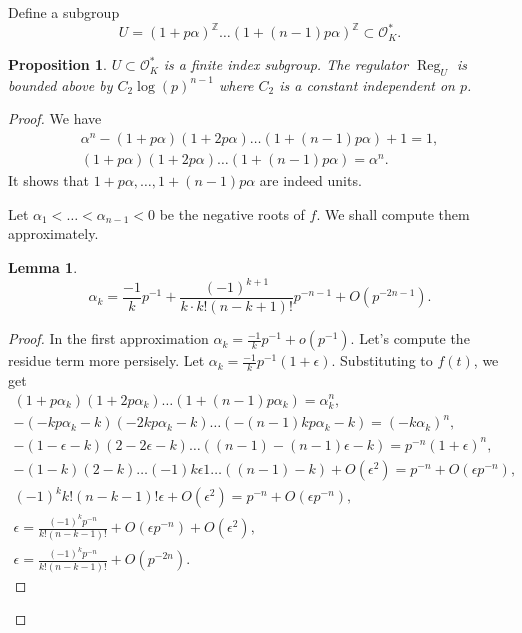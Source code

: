 \documentclass[a4paper]{article}
\newtheorem{Lem}[Thm]{Lemma}
\newtheorem{Prop}[Thm]{Proposition}
\renewcommand{\O}{\mathcal{O}}        %
\DeclareMathOperator{\Reg}{Reg}        %
\begin{document}
Define a subgroup 
\[
	U = (1 + p \alpha)^{\mathbb{Z}} \ldots (1 + (n-1) p \alpha)^{\mathbb{Z}} \subset \O_K^*
.\] 
\begin{Prop}
$U \subset \O_K^*$ is a finite index subgroup.
The regulator $\Reg_U$ is bounded above by $C_2 \log(p)^{n-1}$ where $C_2$ is a constant independent on $p$.
\end{Prop}

\begin{proof}
We have
\begin{gather}
\alpha^n - (1 + p\alpha) (1 + 2p\alpha) \ldots (1 + (n - 1) p\alpha) + 1 = 1  ,
\\
(1 + p\alpha) (1 + 2p\alpha) \ldots (1 + (n - 1) p\alpha) = \alpha^n.
\end{gather}
It shows that $1 + p \alpha, \ldots, 1 + (n - 1) p \alpha$ are indeed units.

Let $\alpha_1 < \ldots < \alpha_{n-1} < 0 $ be the negative roots of $f$.
We shall compute them approximately.
\begin{Lem}
\[
\alpha_k = \frac{-1}{k} p^{-1} + \frac{(-1)^{k + 1} }{ k\cdot  k! (n - k + 1)!} p^{-n-1}  + O(p^{-2 n - 1})
.\] 
\end{Lem}
\begin{proof}
In the first approximation $\alpha_k = \frac{-1}{k} p^{-1} + o(p^{-1})$.
Let's compute the residue term more persisely. 
Let $\alpha_k = \frac{-1}{k} p^{-1} ( 1 + \epsilon )$.
Substituting to $f(t)$, we get
\begin{gather*}
(1 + p\alpha_k) (1 + 2p\alpha_k) \ldots (1 + (n - 1) p\alpha_k) = \alpha_k^n, \\
- (- k p\alpha_k - k) (- 2 k p\alpha_k - k)  \ldots (- (n - 1) k p\alpha_k - k)  = (- k \alpha_k) ^n, \\
- (1 - \epsilon - k) (2 - 2 \epsilon - k)  \ldots ( (n-1) - (n-1) \epsilon - k)  = p^{-n} (1 + \epsilon)^n, \\
- (1 - k) (2 - k) \ldots (- 1) k \epsilon 1 \ldots ( (n-1) - k) + O ( \epsilon^2)
= p^{-n} + O( \epsilon p^{-n} ) , \\
(-1)^k k! ( n - k - 1)! \epsilon + O ( \epsilon^2)
= p^{-n} + O( \epsilon p^{-n} ) , \\
\epsilon = \frac{ (-1)^k p^{-n} }{ k! ( n - k - 1)! }  + O( \epsilon p^{-n} ) + O ( \epsilon^2), \\
\epsilon = \frac{ (-1)^k p^{-n} }{ k! ( n - k - 1)! }  + O( p^{-2n} ).
\end{gather*}
\end{proof}


\end{proof}
\end{document}
